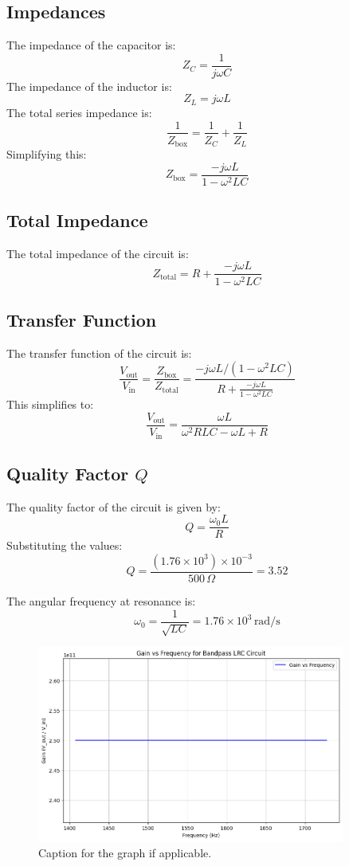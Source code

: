 \documentclass{article}
\begin{document}
\subsection*{Impedances}
The impedance of the capacitor is:
\[
Z_C = \frac{1}{j\omega C}
\]
The impedance of the inductor is:
\[
Z_L = j\omega L
\]
The total series impedance is:
\[
\frac{1}{Z_{\text{box}}} = \frac{1}{Z_C} + \frac{1}{Z_L}
\]
Simplifying this:
\[
Z_{\text{box}} = \frac{-j \omega L}{1 - \omega^2 LC}
\]

\subsection*{Total Impedance}
The total impedance of the circuit is:
\[
Z_{\text{total}} = R + \frac{-j \omega L}{1 - \omega^2 LC}
\]

\subsection*{Transfer Function}
The transfer function of the circuit is:
\[
\frac{V_{\text{out}}}{V_{\text{in}}} = \frac{Z_{\text{box}}}{Z_{\text{total}}} = \frac{-j \omega L / (1 - \omega^2 LC)}{R + \frac{-j \omega L}{1 - \omega^2 LC}}
\]
This simplifies to:
\[
\frac{V_{\text{out}}}{V_{\text{in}}} = \frac{\omega L}{\omega^2 RLC - \omega L + R}
\]

\subsection*{Quality Factor \(Q\)}
The quality factor of the circuit is given by:
\[
Q = \frac{\omega_0 L}{R}
\]
Substituting the values:
\[
Q = \frac{(1.76 \times 10^3) \times 10^{-3}}{500 \, \Omega} = 3.52
\]

The angular frequency at resonance is:
\[
\omega_0 = \frac{1}{\sqrt{LC}} = 1.76 \times 10^3 \, \text{rad/s}
\]

\begin{figure}[H]
    \centering
    \includegraphics[width=0.9\textwidth]{./img/Lab3_6.png}  %
    \caption{Caption for the graph if applicable.}
    \label{fig:graph1}
\end{figure}
\end{document}
